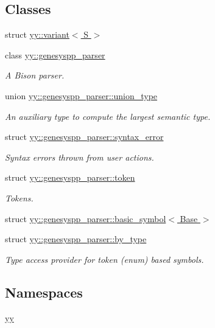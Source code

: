 \subsection*{Classes}
\begin{DoxyCompactItemize}
\item 
struct \hyperlink{structyy_1_1variant}{yy\-::variant$<$ S $>$}
\item 
class \hyperlink{classyy_1_1genesyspp__parser}{yy\-::genesyspp\-\_\-parser}
\begin{DoxyCompactList}\small\item\em A Bison parser. \end{DoxyCompactList}\item 
union \hyperlink{unionyy_1_1genesyspp__parser_1_1union__type}{yy\-::genesyspp\-\_\-parser\-::union\-\_\-type}
\begin{DoxyCompactList}\small\item\em An auxiliary type to compute the largest semantic type. \end{DoxyCompactList}\item 
struct \hyperlink{structyy_1_1genesyspp__parser_1_1syntax__error}{yy\-::genesyspp\-\_\-parser\-::syntax\-\_\-error}
\begin{DoxyCompactList}\small\item\em Syntax errors thrown from user actions. \end{DoxyCompactList}\item 
struct \hyperlink{structyy_1_1genesyspp__parser_1_1token}{yy\-::genesyspp\-\_\-parser\-::token}
\begin{DoxyCompactList}\small\item\em Tokens. \end{DoxyCompactList}\item 
struct \hyperlink{structyy_1_1genesyspp__parser_1_1basic__symbol}{yy\-::genesyspp\-\_\-parser\-::basic\-\_\-symbol$<$ Base $>$}
\item 
struct \hyperlink{structyy_1_1genesyspp__parser_1_1by__type}{yy\-::genesyspp\-\_\-parser\-::by\-\_\-type}
\begin{DoxyCompactList}\small\item\em Type access provider for token (enum) based symbols. \end{DoxyCompactList}\end{DoxyCompactItemize}
\subsection*{Namespaces}
\begin{DoxyCompactItemize}
\item 
\hyperlink{namespaceyy}{yy}
\end{DoxyCompactItemize}
